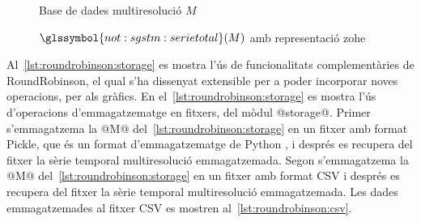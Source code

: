\begin{figure}[tp]
  \centering
   \caption{Base de dades multiresolució $M$}
   \label{fig:python:BDMm}
\end{figure}

\begin{figure}[tp]
  \centering
   \caption{$\glssymbol{not:sgstm:serietotal}(M)$ amb representació \gls{zohe}}
   \label{fig:python:BDMmtotal}
\end{figure}



Al~\autoref{lst:roundrobinson:storage} es mostra l'ús de
funcionalitats complementàries de RoundRobinson, el qual s'ha
dissenyat extensible per a poder incorporar noves operacions, per als
gràfics.  En el~\autoref{lst:roundrobinson:storage} es mostra l'ús
d'operacions d'emmagatzematge en fitxers, del mòdul @storage@. Primer
s'emmagatzema la @M@ del~\autoref{lst:roundrobinson:storage} en un
fitxer amb format Pickle, que és un format d'emmagatzematge de
Python \parencite{python:doc2}, i després es recupera del fitxer la
sèrie temporal multiresolució emmagatzemada.  Segon s'emmagatzema la
@M@ del~\autoref{lst:roundrobinson:storage} en un fitxer amb format
\gls{CSV} i després es recupera del fitxer la sèrie temporal
multiresolució emmagatzemada.  Les dades emmagatzemades al fitxer \gls{CSV} es
mostren al~\autoref{lst:roundrobinson:csv}.

